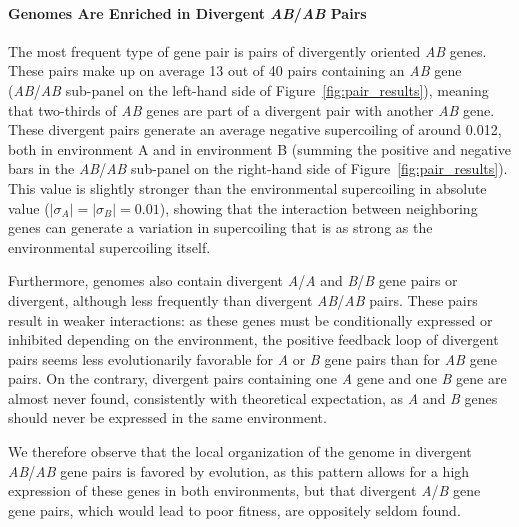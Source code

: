 \paragraph{Genomes Are Enriched in Divergent \emph{AB}/\emph{AB} Pairs}
The most frequent type of gene pair is pairs of divergently oriented \emph{AB} genes.
These pairs make up on average 13 out of 40 pairs containing an \emph{AB} gene (\emph{AB}/\emph{AB} sub-panel on the left-hand side of Figure~\ref{fig:pair_results}), meaning that two-thirds of \emph{AB} genes are part of a divergent pair with another \emph{AB} gene.
These divergent pairs generate an average negative supercoiling of around 0.012, both in environment A and in environment B (summing the positive and negative bars in the \emph{AB}/\emph{AB} sub-panel on the right-hand side of Figure~\ref{fig:pair_results}).
This value is slightly stronger than the environmental supercoiling in absolute value ($|\sigma_A| = |\sigma_B| = 0.01$), showing that the interaction between neighboring genes can generate a variation in supercoiling that is as strong as the environmental supercoiling itself.

Furthermore, genomes also contain divergent \emph{A}/\emph{A} and \emph{B}/\emph{B} gene pairs or divergent, although less frequently than divergent \emph{AB}/\emph{AB} pairs.
These pairs result in weaker interactions: as these genes must be conditionally expressed or inhibited depending on the environment, the positive feedback loop of divergent pairs seems less evolutionarily favorable for \emph{A} or \emph{B} gene pairs than for \emph{AB} gene pairs.
On the contrary, divergent pairs containing one \emph{A} gene and one \emph{B} gene are almost never found, consistently with theoretical expectation, as \emph{A} and \emph{B} genes should never be expressed in the same environment.

We therefore observe that the local organization of the genome in divergent \emph{AB}/\emph{AB} gene pairs is favored by evolution, as this pattern allows for a high expression of these genes in both environments, but that divergent \emph{A}/\emph{B} gene gene pairs, which would lead to poor fitness, are oppositely seldom found.

